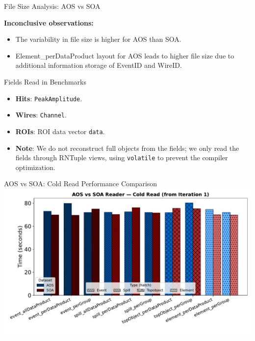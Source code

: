 \documentclass[aspectratio=169]{beamer}
\begin{document}
\begin{frame}{File Size Analysis: AOS vs SOA}
{\begin{minipage}[t]{0.38\textwidth}
    \end{minipage}
  }
  \textbf{Inconclusive observations:}
  \begin{itemize}
    \item The variability in file size is higher for AOS than SOA.
    \item Element\_perDataProduct layout for AOS leads to higher file size due to additional information storage of EventID and WireID. 
  \end{itemize}
\end{frame}

\begin{frame}{Fields Read in Benchmarks}
\small
\begin{itemize}
  \item \textbf{Hits}: \texttt{PeakAmplitude}.
  \item \textbf{Wires}: \texttt{Channel}.
  \item \textbf{ROIs}: ROI data vector \texttt{data}.
  \vspace{1.5em}
  \item \textbf{Note}: We do not reconstruct full objects from the fields; we only read the fields through RNTuple views, using \texttt{volatile} to prevent the compiler optimization.
\end{itemize}
\end{frame}

\begin{frame}{AOS vs SOA: Cold Read Performance Comparison}
\centering
\includegraphics[width=0.8\linewidth]{../experiments/Seaborn/AOS_SOA_Reader_Cold_grouped_progressive.pdf}
\end{frame}
\end{document}
